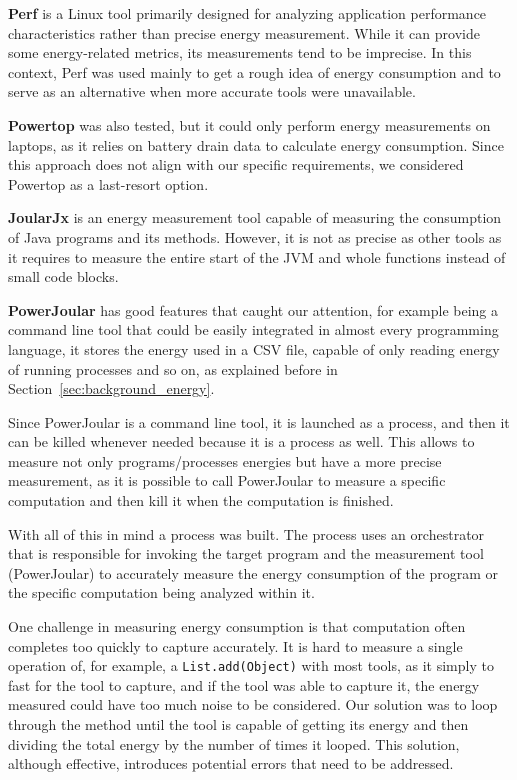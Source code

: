 \textbf{Perf} is a Linux tool primarily designed for analyzing application performance characteristics rather than precise energy measurement. While it can provide some energy-related metrics, its measurements tend to be imprecise. In this context, Perf was used mainly to get a rough idea of energy consumption and to serve as an alternative when more accurate tools were unavailable.

\textbf{Powertop} was also tested, but it could only perform energy measurements on laptops, as it relies on battery drain data to calculate energy consumption. Since this approach does not align with our specific requirements, we considered Powertop as a last-resort option.

\textbf{JoularJx} is an energy measurement tool capable of measuring the consumption of Java programs and its methods. However, it is not as precise as other tools as it requires to measure the entire start of the JVM and whole functions instead of small code blocks.


\textbf{PowerJoular} has good features that caught our attention, for example being a command line tool that could be easily integrated in almost every programming language, it stores the energy used in a CSV file, capable of only reading energy of running processes and so on, as explained before in Section~\ref{sec:background_energy}.

Since PowerJoular is a command line tool, it is launched as a process, and then it can be killed whenever needed because it is a process as well. This allows to measure not only programs/processes energies but have a more precise measurement, as it is possible to call PowerJoular to measure a specific computation and then kill it when the computation is finished.

With all of this in mind a process was built. The process uses an orchestrator that is responsible for invoking the target program and the measurement tool (PowerJoular) to accurately measure the energy consumption of the program or the specific computation being analyzed within it.


One challenge in measuring energy consumption is that computation often completes too quickly to capture accurately. It is hard to measure a single operation of, for example, a \texttt{List.add(Object)} with most tools, as it simply to fast for the tool to capture, and if the tool was able to capture it, the energy measured could have too much noise to be considered. Our solution was to loop through the method until the tool is capable of getting its energy and then dividing the total energy by the number of times it looped. 
This solution, although effective, introduces potential errors that need to be addressed.

